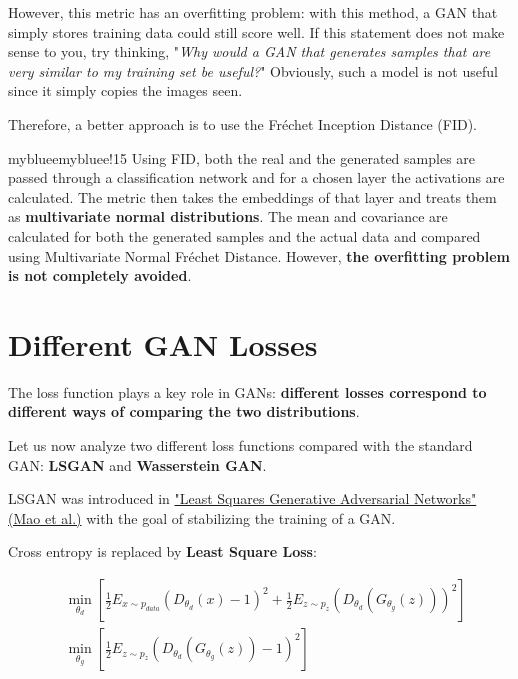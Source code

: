 However, this metric has an overfitting problem: with this method, a GAN that simply stores training data could still score well. If this statement does not make sense to you, try thinking, "\textit{Why would a GAN that generates samples that are very similar to my training set be useful?}" Obviously, such a model is not useful since it simply copies the images seen. 

Therefore, a better approach is to use the Fréchet Inception Distance (FID).

\begin{remark}{mybluee}{mybluee!15}
Using FID, both the real and the generated samples are passed through a classification network and for a chosen layer the activations are calculated. The metric then takes the embeddings of that layer and treats them as \textbf{multivariate normal distributions}. The mean and covariance are calculated for both the generated samples and the actual data and compared using Multivariate Normal Fréchet Distance. However, \textbf{the overfitting problem is not completely avoided}.
\end{remark}

\section{Different GAN Losses}

The loss function plays a key role in GANs: \textbf{different losses correspond to different ways of comparing the two distributions}.

Let us now analyze two different loss functions compared with the standard GAN: \textbf{LSGAN} and \textbf{Wasserstein GAN}.

LSGAN was introduced in \href{https://arxiv.org/pdf/1611.04076}{"Least Squares Generative Adversarial Networks" (Mao et al.)} with the goal of stabilizing the training of a GAN.

Cross entropy is replaced by \textbf{Least Square Loss}:

\vspace{-0.5cm}
{\Large
\begin{equation*}
\begin{aligned}
    &\min_{\theta_{d}} \left[\frac{1}{2}E_{x \sim p_{data}} \left(D_{\theta_{d}}(x) - 1\right)^2 + \frac{1}{2}E_{z \sim p_{z}} \left(D_{\theta_{d}}(G_{\theta_{g}}(z))\right)^2\right] \\
    &\min_{\theta_{g}} \left[\frac{1}{2}E_{z \sim p_{z}} \left(D_{\theta_{d}}(G_{\theta_{g}}(z)) - 1\right)^2\right]
\end{aligned}
\end{equation*}
}

